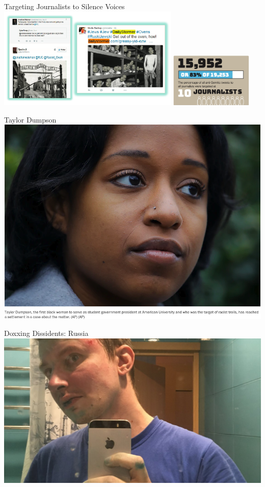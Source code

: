 \documentclass[nobackground,dvipsnames,table,aspectratio=169]{beamer}
\begin{document}
\begin{frame}{Targeting Journalists to Silence Voices}
    \includegraphics[width=0.65\textwidth]{silencing-journalists-holocaust}
    \includegraphics[width=0.3\textwidth]{anti-semitic-tweets-stats}
\end{frame}

\begin{frame}{Taylor Dumpson}
    \centering
    \includegraphics[height=0.85\textheight]{taylor-dumpson}
\end{frame}

\begin{frame}{Doxxing Dissidents: Russia}
    \includegraphics[width=\textwidth]{russian-dissident}
\end{frame}
\end{document}
